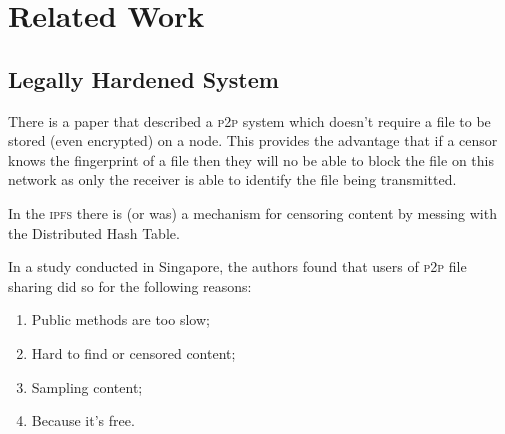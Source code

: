 \section{Related Work}\label{sec:related}

\subsection{Legally Hardened System}

There is a paper that described a \textsc{p2p} system which doesn't require a
file to be stored (even encrypted) on a
node.\cite{CensorshipresistantAnonymousP2P} This provides the advantage that if
a censor knows the fingerprint of a file then they will no be able to block the
file on this network as only the receiver is able to identify the file being
transmitted.


In the \textsc{ipfs} there is (or was) a mechanism for censoring content by
messing with the Distributed Hash
Table.\cite{sridharContentCensorshipInterPlanetary2023}

In a study conducted in Singapore, the authors found that users of \textsc{p2p}
file sharing did so for the following reasons:\cite{MoreJustFree}
\begin{enumerate}[nosep]
  \item Public methods are too slow;
  \item Hard to find or censored content;
  \item Sampling content;
  \item Because it's free.
\end{enumerate}


